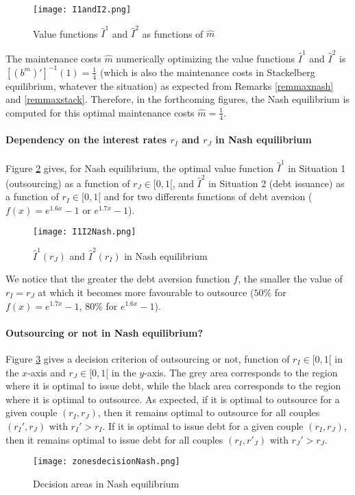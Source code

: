 \documentclass{svjour3}
\begin{document}
\begin{figure}[ht]
    \centering
    \texttt{[image: I1andI2.png]}
    \caption{Value functions $\hat{I}^1$ and $\hat{I}^2$ as functions of $\hat{m}$}
    \label{fig:I1(m)andI2(m)}
\end{figure}

The  maintenance costs $\hat{m}$ numerically optimizing the value functions $\hat{I}^1$ and $\hat{I}^2$  is $[(b^m)']^{-1}(1)=\frac{1}{4}$ (which is also the maintenance costs in Stackelberg equilibrium, whatever the situation) as expected from Remarks \ref{remmaxnash} and \ref{remmaxstack}. Therefore, in the forthcoming figures, the Nash equilibrium is computed for this optimal maintenance costs $\hat{m}=\frac{1}{4}$.
\newpage

\paragraph{Dependency on the interest rates $r_I$ and $r_J$ in Nash equilibrium}
Figure \ref{fig:I1(r_J)I2(r_I)Nash} gives, for Nash equilibrium,  the optimal value function $\hat{I}^1$ in Situation 1 (outsourcing) as a function of $r_J \in [0,1[$,  
and $\hat{I}^2$ in Situation 2 (debt issuance) as a function of $r_I \in [0,1[$ and for two differents functions of debt aversion ($f(x) = e^{1.6 x} - 1$  or  $e^{1.7 x} - 1$).
\begin{figure}[ht]
    \centering
    \texttt{[image: I1I2Nash.png]}
    \caption{$\hat{I}^1(r_J)$ and $\hat{I}^2(r_I)$ in Nash equilibrium}
    \label{fig:I1(r_J)I2(r_I)Nash}
\end{figure}
We notice that the greater the debt aversion function $f$, the smaller the value of $r_I=r_J$ at which it becomes more favourable to outsource ($50\%$ for $f(x) = e^{1.7 x} - 1$,   $80\%$  for $e^{1.6 x} - 1$).

\paragraph{Outsourcing or not in Nash equilibrium?}
Figure \ref{fig:zonesdecisionNash} gives a decision criterion of outsourcing or not, function of $r_I\in[0,1[$ in the $x$-axis and $r_J\in[0,1[$ in the $y$-axis. The grey area corresponds to the region where it is optimal to issue debt, while the black area corresponds to the region where it is optimal to outsource. As expected, if it is optimal to outsource for a given couple $(r_I,r_J)$, then it remains optimal to outsource for all couples $(r_I',r_J)$ with $r_I'>r_I$. If it is optimal to issue debt for a given couple $(r_I,r_J)$, then it remains optimal to issue debt for all couples $(r_I,r'_J)$ with $r_J'>r_J$.
\begin{figure}[ht]
    \centering
    \texttt{[image: zonesdecisionNash.png]}
    \caption{Decision areas in Nash equilibrium}
    \label{fig:zonesdecisionNash}
\end{figure}
\end{document}
